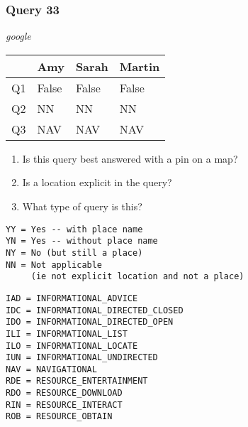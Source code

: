 \begin{frame}[fragile]
\frametitle{Query 33}
\vspace{1em}

\emph{google}

\vfill

\begin{table}
  \centering
  \begin{tabular}{ l l l l }
    & \textbf{Amy} & \textbf{Sarah} & \textbf{Martin}\\
    \toprule
    Q1 & False & False & False\\
Q2 & NN & NN & NN\\
Q3 & NAV & NAV & NAV\\
    \bottomrule
  \end{tabular}
\end{table}

\vfill

\tiny{

\begin{enumerate}
\item Is this query best answered with a pin on a map?
\item Is a location explicit in the query?
\item What type of query is this?
\end{enumerate}

\vfill

\begin{multicols}{2}
\begin{verbatim}
YY = Yes -- with place name
YN = Yes -- without place name
NY = No (but still a place)
NN = Not applicable 
     (ie not explicit location and not a place)
\end{verbatim}

\columnbreak
\begin{verbatim}
IAD = INFORMATIONAL_ADVICE
IDC = INFORMATIONAL_DIRECTED_CLOSED
IDO = INFORMATIONAL_DIRECTED_OPEN
ILI = INFORMATIONAL_LIST
ILO = INFORMATIONAL_LOCATE
IUN = INFORMATIONAL_UNDIRECTED
NAV = NAVIGATIONAL
RDE = RESOURCE_ENTERTAINMENT
RDO = RESOURCE_DOWNLOAD
RIN = RESOURCE_INTERACT
ROB = RESOURCE_OBTAIN
\end{verbatim}
\end{multicols}
}

\end{frame}


